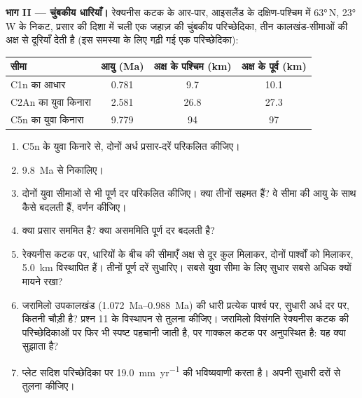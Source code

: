 \begin{problem}
\noindent\textbf{भाग II --- चुंबकीय धारियाँ।}
रेक्यनीस कटक के आर-पार, आइसलैंड के दक्षिण-पश्चिम में \ang{63}\,N, \ang{23}\,W के निकट, प्रसार की दिशा में चली एक जहाज़ की चुंबकीय परिच्छेदिका, तीन कालखंड-सीमाओं की अक्ष से दूरियाँ देती है (इस समस्या के लिए गढ़ी गई एक परिच्छेदिका):
\begin{center}\small
\begin{tabular}{lccc}
\hline
सीमा & आयु (Ma) & अक्ष के पश्चिम (km) & अक्ष के पूर्व (km)\\
\hline
C1n का आधार & 0.781 & 9.7 & 10.1\\
C2An का युवा किनारा & 2.581 & 26.8 & 27.3\\
C5n का युवा किनारा & 9.779 & 94 & 97\\
\hline
\end{tabular}
\end{center}
\begin{enumerate}[resume]
  \item C5n के युवा किनारे से, दोनों अर्ध प्रसार-दरें परिकलित कीजिए।
  \item \qty{9.8}{Ma} से  निकालिए।
  \item दोनों युवा सीमाओं से भी पूर्ण दर परिकलित कीजिए। क्या तीनों सहमत हैं? वे सीमा की आयु के साथ कैसे बदलती हैं, वर्णन कीजिए।
  \item क्या प्रसार सममित है? क्या असममिति पूर्ण दर बदलती है?
  \item रेक्यनीस कटक पर, धारियों के बीच की सीमाएँ अक्ष से दूर कुल मिलाकर, दोनों पार्श्वों को मिलाकर, \qty{5.0}{km} विस्थापित हैं। तीनों पूर्ण दरें सुधारिए। सबसे युवा सीमा के लिए सुधार सबसे अधिक क्यों मायने रखा?
  \item जरामिलो उपकालखंड (\qtyrange{1.072}{0.988}{Ma}) की धारी प्रत्येक पार्श्व पर, सुधारी अर्ध दर पर, कितनी चौड़ी है? प्रश्न 11 के विस्थापन से तुलना कीजिए। जरामिलो विसंगति रेक्यनीस कटक की परिच्छेदिकाओं पर फिर भी स्पष्ट पहचानी जाती है, पर गाक्कल कटक पर अनुपस्थित है: यह क्या सुझाता है?
  \item प्लेट सदिश परिच्छेदिका पर \qty{19.0}{mm.yr^{-1}} की भविष्यवाणी करता है। अपनी सुधारी दरों से तुलना कीजिए।
\end{enumerate}


\end{problem}
